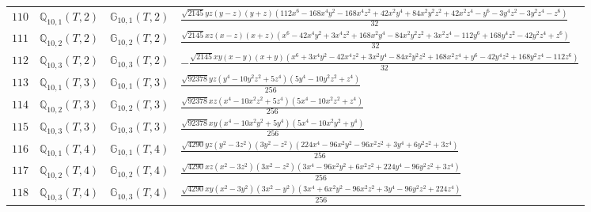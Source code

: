 \documentclass[fleqn,8pt,landscape]{jsarticle}
\begin{document}
\begin{table}[ht!]
\begin{center}
\begin{tabular}{cccl}
$ 110 $ & $ \mathbb{Q}_{10,1}(T,2) $ & $ \mathbb{G}_{10,1}(T,2) $ & $ \frac{\sqrt{2145} y z \left(y - z\right) \left(y + z\right) \left(112 x^{6} - 168 x^{4} y^{2} - 168 x^{4} z^{2} + 42 x^{2} y^{4} + 84 x^{2} y^{2} z^{2} + 42 x^{2} z^{4} - y^{6} - 3 y^{4} z^{2} - 3 y^{2} z^{4} - z^{6}\right)}{32} $ \\
$ 111 $ & $ \mathbb{Q}_{10,2}(T,2) $ & $ \mathbb{G}_{10,2}(T,2) $ & $ \frac{\sqrt{2145} x z \left(x - z\right) \left(x + z\right) \left(x^{6} - 42 x^{4} y^{2} + 3 x^{4} z^{2} + 168 x^{2} y^{4} - 84 x^{2} y^{2} z^{2} + 3 x^{2} z^{4} - 112 y^{6} + 168 y^{4} z^{2} - 42 y^{2} z^{4} + z^{6}\right)}{32} $ \\
$ 112 $ & $ \mathbb{Q}_{10,3}(T,2) $ & $ \mathbb{G}_{10,3}(T,2) $ & $ - \frac{\sqrt{2145} x y \left(x - y\right) \left(x + y\right) \left(x^{6} + 3 x^{4} y^{2} - 42 x^{4} z^{2} + 3 x^{2} y^{4} - 84 x^{2} y^{2} z^{2} + 168 x^{2} z^{4} + y^{6} - 42 y^{4} z^{2} + 168 y^{2} z^{4} - 112 z^{6}\right)}{32} $ \\
$ 113 $ & $ \mathbb{Q}_{10,1}(T,3) $ & $ \mathbb{G}_{10,1}(T,3) $ & $ \frac{\sqrt{92378} y z \left(y^{4} - 10 y^{2} z^{2} + 5 z^{4}\right) \left(5 y^{4} - 10 y^{2} z^{2} + z^{4}\right)}{256} $ \\
$ 114 $ & $ \mathbb{Q}_{10,2}(T,3) $ & $ \mathbb{G}_{10,2}(T,3) $ & $ \frac{\sqrt{92378} x z \left(x^{4} - 10 x^{2} z^{2} + 5 z^{4}\right) \left(5 x^{4} - 10 x^{2} z^{2} + z^{4}\right)}{256} $ \\
$ 115 $ & $ \mathbb{Q}_{10,3}(T,3) $ & $ \mathbb{G}_{10,3}(T,3) $ & $ \frac{\sqrt{92378} x y \left(x^{4} - 10 x^{2} y^{2} + 5 y^{4}\right) \left(5 x^{4} - 10 x^{2} y^{2} + y^{4}\right)}{256} $ \\
$ 116 $ & $ \mathbb{Q}_{10,1}(T,4) $ & $ \mathbb{G}_{10,1}(T,4) $ & $ \frac{\sqrt{4290} y z \left(y^{2} - 3 z^{2}\right) \left(3 y^{2} - z^{2}\right) \left(224 x^{4} - 96 x^{2} y^{2} - 96 x^{2} z^{2} + 3 y^{4} + 6 y^{2} z^{2} + 3 z^{4}\right)}{256} $ \\
$ 117 $ & $ \mathbb{Q}_{10,2}(T,4) $ & $ \mathbb{G}_{10,2}(T,4) $ & $ \frac{\sqrt{4290} x z \left(x^{2} - 3 z^{2}\right) \left(3 x^{2} - z^{2}\right) \left(3 x^{4} - 96 x^{2} y^{2} + 6 x^{2} z^{2} + 224 y^{4} - 96 y^{2} z^{2} + 3 z^{4}\right)}{256} $ \\
$ 118 $ & $ \mathbb{Q}_{10,3}(T,4) $ & $ \mathbb{G}_{10,3}(T,4) $ & $ \frac{\sqrt{4290} x y \left(x^{2} - 3 y^{2}\right) \left(3 x^{2} - y^{2}\right) \left(3 x^{4} + 6 x^{2} y^{2} - 96 x^{2} z^{2} + 3 y^{4} - 96 y^{2} z^{2} + 224 z^{4}\right)}{256} $ \\

\end{tabular}
\end{center}
\end{table}
\end{document}
